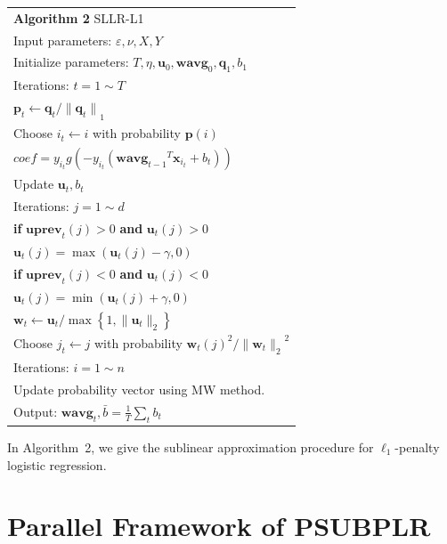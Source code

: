 \documentclass{llncs}
\newcommand{\bw}{\mathbf{w}}
\newcommand{\bwavg}{\mathbf{wavg}}
\newcommand{\bu}{\mathbf{u}}
\newcommand{\buprev}{\mathbf{uprev}}
\newcommand{\bp}{\mathbf{p}}
\newcommand{\bq}{\mathbf{q}}
\newcommand{\lc}{\left(}
\newcommand{\rc}{\right)}
\newcommand{\lj}{\lc j\rc}
\newcommand{\tspace}{\hspace*{2em}}
\begin{document}
    \begin{table}[ht]
	\begin{tabular}{l}
	\hline\noalign{\smallskip}
    \textbf{Algorithm 2} SLLR-L1 \\
	\noalign{\smallskip}
	\hline
	\noalign{\smallskip}
        Input parameters: $\varepsilon, \nu, X, Y$ \\
		Initialize parameters: $T, \eta, {\mathbf{u}}_{0}, {\bwavg}_{0}, {\mathbf{\bq}}_{1}, {b}_{1}$\\
		Iterations: $t=1 \sim T$ \\
		\tspace ${\bp}_{t}\leftarrow{\bq}_{t}/{\|{\bq}_{t}\|}_{1}$ \\
	    \tspace Choose ${i}_{t}\leftarrow i$ with probability $\bp(i)$ \\
		\tspace $coef={y}_{{i}_{t}}g\lc-{y}_{{i}_{t}}\lc {{\bwavg}_{t-1}}^{T}{\mathbf{x}}_{i_t}+{b}_{t} \rc\rc$ \\
		\tspace Update ${\bu}_{t}, {b}_{t}$ \\
        \tspace Iterations: $j=1 \sim d$ \\
        \tspace\tspace \textbf{if} $\buprev_t\lj>0$ \textbf{and} $\bu_t\lj>0$ \\
		\tspace\tspace\tspace $\bu_t\lj=\max \lc \bu_t\lj-\gamma ,0 \rc$ \\
		\tspace\tspace \textbf{if} $\buprev_t\lj<0$ \textbf{and} $\bu_t\lj<0$ \\
		\tspace\tspace\tspace $\bu_t\lj=\min \lc \bu_t\lj+\gamma ,0 \rc$ \\
		\tspace ${\bw}_{t}\leftarrow {\bu}_{t}/\max \left\{1,\|{\bu}_{t}\|_2 \right\}$ \\
		\tspace Choose ${j}_{t}\leftarrow j$ with probability ${{\bw}_{t}\lj}^{2}/{\|{\bw}_{t}\|_2}^{2} $ \\
		\tspace Iterations: $i=1 \sim n$ \\
		\tspace\tspace Update probability vector using MW method. \\
		Output: $\bwavg_t,\bar{b}=\frac{1}{T}\sum_{t}{b}_{t}$ \\
	\hline
	\end{tabular}
	\end{table}	
	In Algorithm~2, we give the sublinear approximation procedure for $\ell_1$-penalty logistic regression.

\section{Parallel Framework of PSUBPLR} \label{sec:framework}
	
\end{document}
